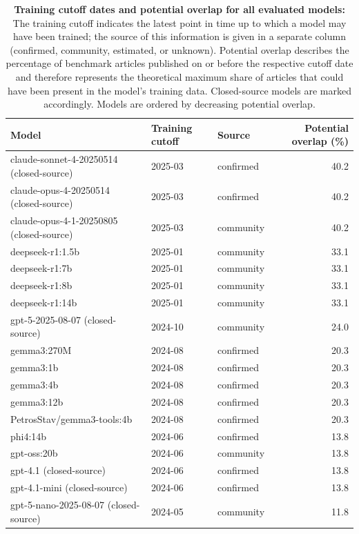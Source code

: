 \clearpage
\begin{table}[!htbp]
\centering
\scriptsize
\caption{\textbf{Training cutoff dates and potential overlap for all evaluated models:} 
The training cutoff indicates the latest point in time up to which a model may have been trained; the source of this information is given in a separate column (confirmed, community, estimated, or unknown). Potential overlap describes the percentage of benchmark articles published on or before the respective cutoff date and therefore represents the theoretical maximum share of articles that could have been present in the model's training data. Closed-source models are marked accordingly. Models are ordered by decreasing potential overlap.\label{tab:training_cutoff_overlap}}
\begin{tabularx}{\linewidth}{X l l r}
\toprule
\textbf{Model} & \textbf{Training cutoff} & \textbf{Source} & \textbf{Potential overlap (\%)} \\
\midrule
claude-sonnet-4-20250514 (closed-source) & 2025-03 & confirmed & 40.2 \\
claude-opus-4-20250514 (closed-source) & 2025-03 & confirmed & 40.2 \\
claude-opus-4-1-20250805 (closed-source) & 2025-03 & community & 40.2 \\
deepseek-r1:1.5b & 2025-01 & community & 33.1 \\
deepseek-r1:7b & 2025-01 & community & 33.1 \\
deepseek-r1:8b & 2025-01 & community & 33.1 \\
deepseek-r1:14b & 2025-01 & community & 33.1 \\
gpt-5-2025-08-07 (closed-source) & 2024-10 & community & 24.0 \\
gemma3:270M & 2024-08 & confirmed & 20.3 \\
gemma3:1b & 2024-08 & confirmed & 20.3 \\
gemma3:4b & 2024-08 & confirmed & 20.3 \\
gemma3:12b & 2024-08 & confirmed & 20.3 \\
PetrosStav/gemma3-tools:4b & 2024-08 & confirmed & 20.3 \\
phi4:14b & 2024-06 & confirmed & 13.8 \\
gpt-oss:20b & 2024-06 & community & 13.8 \\
gpt-4.1 (closed-source) & 2024-06 & confirmed & 13.8 \\
gpt-4.1-mini (closed-source) & 2024-06 & confirmed & 13.8 \\
gpt-5-nano-2025-08-07 (closed-source) & 2024-05 & community & 11.8 \\

\end{tabularx}
\end{table}
